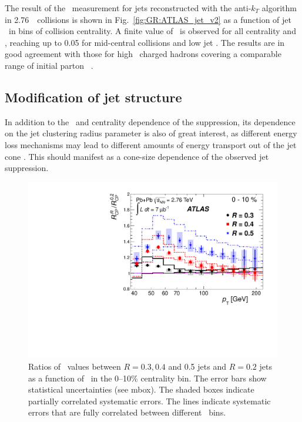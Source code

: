 The result of the \vtwo\ measurement for jets reconstructed with the anti-$k_T$ 
algorithm in 2.76\TeV\ \PbPb\ collisions is shown in Fig.~\ref{fig:GR:ATLAS_jet_v2}
as a function of jet \pT\ in bins of collision centrality. A finite
value of \vtwo\ is observed for all centrality and \pT, reaching up to 0.05 for
mid-central collisions and low jet \pT. The results are in good agreement
with those for high \pT\ charged hadrons covering a comparable range
of initial parton \pT~\cite{Chatrchyan:2012xq}.

\subsection{Modification of jet structure}

In addition to the \pT\ and centrality dependence of the suppression, its dependence on the 
jet clustering radius parameter is also of great interest, as different energy loss 
mechanisms may lead to different amounts of energy transport out of the jet cone
\cite{Vitev:2008rz, Vitev:2009rd,He:2011pd}. This should manifest as a cone-size 
dependence of the observed jet suppression.
\begin{figure}[!h]
\begin{center}
\includegraphics[width=0.49\mboxwidth]{jetfigures/ATLAS_jetRCP_size.pdf}
\caption{
Ratios of \Rcp\ values between $R = 0.3, 0.4$ and 0.5 jets and $R =
0.2$ jets as a function of \pT\ in the 0--10\% centrality bin. The
error bars show statistical uncertainties (see mbox). The shaded boxes
indicate partially correlated systematic errors. The lines indicate
systematic errors that are fully correlated between different \pT\ bins.
}
\label{fig:GR:ATLAS_jetRCP_size}
\end{center}
\end{figure}

